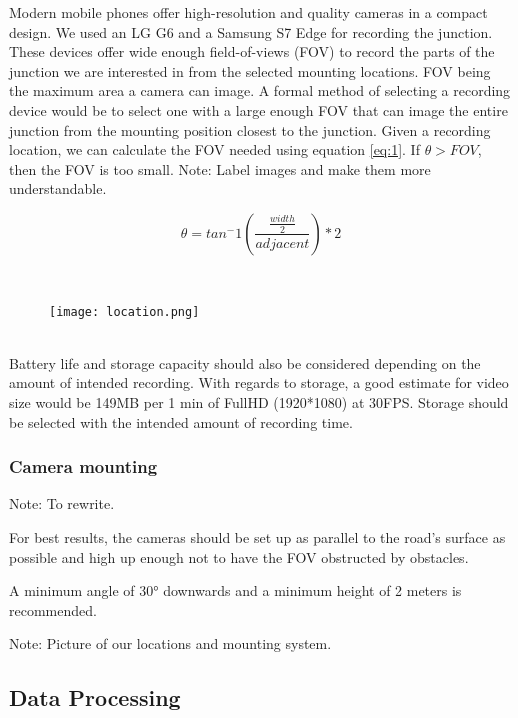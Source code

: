 Modern mobile phones offer high-resolution and quality cameras in a compact design. We used an LG G6 and a Samsung S7 Edge for recording the junction.
These devices offer wide enough field-of-views (FOV) to record the parts of the junction we are interested in from the selected mounting locations.
FOV being the maximum area a camera can image. A formal method of selecting a recording device would be to select one with a large enough FOV that can image the entire junction from the mounting position closest to the junction. Given a recording location, we can calculate the FOV needed using equation \ref{eq:1}.
If $\theta > FOV$, then the FOV is too small. 
\color{red}
Note: Label images and make them more understandable.
\color{black}

\begin{equation}
    \theta = tan^-1(\frac{\frac{width}{2}}{adjacent}) * 2\label{eq:1}
  \end{equation}

\ \\ 
\begin{figure}[h]
\texttt{[image: location.png]}
\centering 
\end{figure}
\label{Camera location}

\ \\
Battery life and storage capacity should also be considered depending on the amount of intended recording. 
With regards to storage, a good estimate for video size would be 149MB per 1 min of FullHD (1920*1080) at 30FPS. Storage should be selected
with the intended amount of recording time.

\subsubsection{Camera mounting}

\color{red}
Note: To rewrite.
\color{black}

For best results, the cameras should be set up as parallel to the road's surface as possible and high up enough not to have the FOV obstructed by obstacles.

A minimum angle of 30° downwards and a minimum height of 2 meters is recommended.

Note: Picture of our locations and mounting system.

\subsection{Data Processing}

